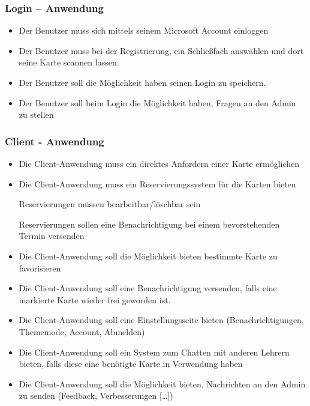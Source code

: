 \subsubsection{Login – Anwendung}
\begin{itemize}
  \item Der Benutzer muss sich mittels seinem Microsoft Account einloggen
  \item Der Benutzer muss bei der Registrierung, ein Schlie\ss fach ausw\"ahlen und dort seine Karte scannen lassen.
  \item Der Benutzer soll die Möglichkeit haben seinen Login zu speichern.
    \item Der Benutzer soll beim Login die Möglichkeit haben, Fragen an den Admin zu stellen

\end{itemize}

\subsubsection{Client - Anwendung}
\begin{itemize}

    \item Die Client-Anwendung muss ein direktes Anfordern einer Karte erm\"oglichen

    \item Die Client-Anwendung muss ein Reservierungssystem f\"ur die Karten bieten

    \subitem Reservierungen m\"ussen bearbeitbar/l\"oschbar sein

    \subitem Reservierungen sollen eine Benachrichtigung bei einem bevorstehenden Termin versenden


    \item Die Client-Anwendung soll die Möglichkeit bieten bestimmte Karte zu favorisieren 

    
    \item Die Client-Anwendung soll eine Benachrichtigung versenden, falls eine markierte Karte wieder frei geworden ist.

    \item Die Client-Anwendung soll eine Einstellungsseite bieten (Benachrichtigungen, Thememode, Account, Abmelden)
    \item Die Client-Anwendung soll ein System zum Chatten mit anderen Lehrern bieten, falls diese eine ben\"otigte Karte in Verwendung haben

    \item Die Client-Anwendung soll die Möglichkeit bieten, Nachrichten an den Admin zu senden (Feedback, Verbesserungen […])
\end{itemize}

